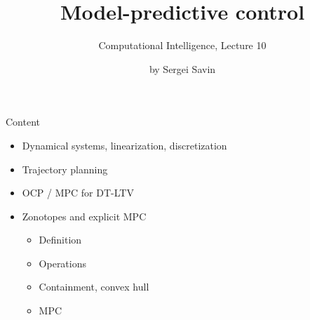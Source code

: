 \documentclass{beamer}
\title{Model-predictive control}
\subtitle{Computational Intelligence, Lecture 10}
\author{by Sergei Savin}
\date{\mydate}
\begin{document}
\maketitle


\begin{frame}{Content}

\begin{itemize}
\item  Dynamical systems, linearization, discretization
\item Trajectory planning
\item OCP / MPC for DT-LTV
\item Zonotopes and explicit MPC
	\begin{itemize}
		\item  Definition
		\item  Operations
		\item Containment, convex hull
		\item MPC
	\end{itemize}
\end{itemize}

\end{frame}
\end{document}
